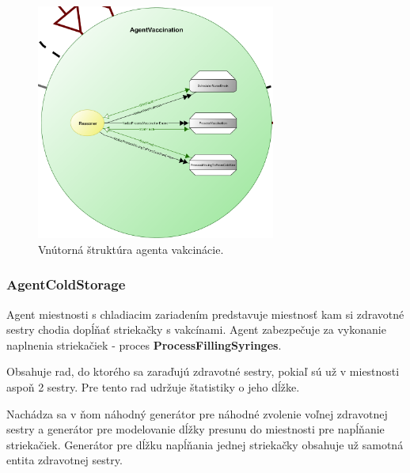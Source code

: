 \documentclass[letterpaper]{article}
\begin{document}
	\begin{figure}[hbt!]
		\centering
		\includegraphics[width=0.7\textwidth]{src/AgentVaccination}
		\caption{Vnútorná štruktúra agenta vakcinácie.}
	\end{figure}
	
	\newpage
	
	\subsubsection{AgentColdStorage}
	
	Agent miestnosti s chladiacim zariadením predstavuje miestnosť kam si zdravotné sestry chodia dopĺňať striekačky s vakcínami. Agent zabezpečuje za vykonanie naplnenia striekačiek  - proces \textbf{ProcessFillingSyringes}.
	
	Obsahuje rad, do ktorého sa zaraďujú zdravotné sestry, pokiaľ sú už v miestnosti aspoň 2 sestry. Pre tento rad udržuje štatistiky o jeho dĺžke.
	
	Nachádza sa v ňom náhodný generátor pre náhodné zvolenie voľnej zdravotnej sestry a generátor pre modelovanie dĺžky presunu do miestnosti pre napĺňanie striekačiek. Generátor pre dĺžku napĺňania jednej striekačky obsahuje už samotná entita zdravotnej sestry.
	
	\vspace{0.8cm}
	
\end{document}
